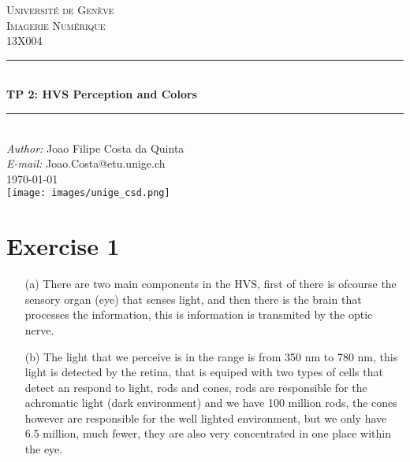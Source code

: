 \documentclass[a4paper]{article}
\makeatletter
\newcommand\TPid{2}
\newcommand\TPname{HVS Perception and Colors}
\newcommand\Firstname{Joao Filipe}
\newcommand\Familyname{Costa da Quinta}
\newcommand\Email{Joao.Costa@etu.unige.ch}
\makeatother
\begin{document}
\begin{titlepage}

\newcommand{\HRule}{\rule{\linewidth}{0.5mm}} 							%
\newcommand\tab[1][1cm]{\hspace*{#1}}
\center 
 
\textsc{\LARGE Université de Genève}\\[1cm]

\textsc{\Large Imagerie Numérique}\\[0.2cm]
\textsc{\large 13X004}\\[1cm] 										%
\HRule \\[0.8cm]
{ \huge \bfseries TP \TPid : \TPname}\\[0.7cm]								%
\HRule \\[2cm]
\large
\emph{Author:} \Firstname \; \Familyname\\[0.5cm]		
\emph{E-mail:} {\color{blue}\Email}\\[7cm]		
{\large \today}\\[2cm]
\texttt{[image: images/unige\_csd.png]}\\[1cm] 	%
\vfill 
\end{titlepage}


\section*{Exercise 1}
\begin{itemize}
\item[(a)] There are two main components in the HVS, first of there is ofcourse the sensory organ (eye) that senses light, and then there is the brain that processes the information, this is information is transmited by the optic nerve.
\item[(b)] The light that we perceive is in the range is from 350 nm to 780 nm, this light is detected by the retina, that is equiped with two types of cells that detect an respond to light, rods and cones, rods are responsible for the achromatic light (dark environment) and we have 100 million rods, the cones however are responsible for the well lighted environment, but we only have 6.5 million, much fewer, they are also very concentrated in one place within the eye.
\end{itemize}

\end{document}

